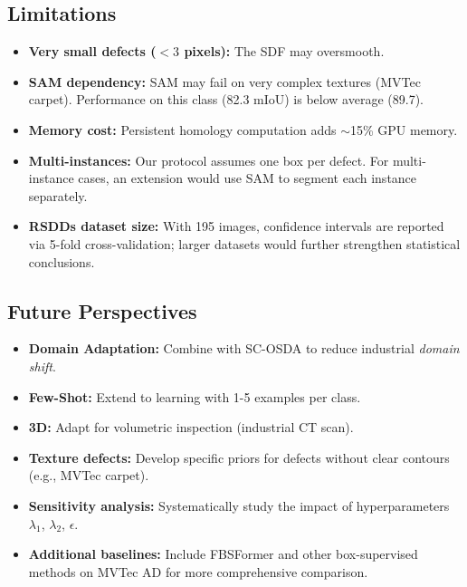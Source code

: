 \documentclass[12pt, a4paper]{article}
\begin{document}
\subsection{Limitations}
\label{subsec:limitations}

\begin{itemize}
    \item \textbf{Very small defects ($< 3$ pixels):} The SDF may oversmooth.
    \item \textbf{SAM dependency:} SAM may fail on very complex textures (MVTec carpet). Performance on this class (82.3 mIoU) is below average (89.7).
    \item \textbf{Memory cost:} Persistent homology computation adds $\sim$15\% GPU memory.
    \item \textbf{Multi-instances:} Our protocol assumes one box per defect. For multi-instance cases, an extension would use SAM to segment each instance separately.
    \item \textbf{RSDDs dataset size:} With 195 images, confidence intervals are reported via 5-fold cross-validation; larger datasets would further strengthen statistical conclusions.
\end{itemize}

\subsection{Future Perspectives}
\label{subsec:future_work}

\begin{itemize}
    \item \textbf{Domain Adaptation:} Combine with SC-OSDA \cite{ma2023scosda} to reduce industrial \textit{domain shift}.
    \item \textbf{Few-Shot:} Extend to learning with 1-5 examples per class.
    \item \textbf{3D:} Adapt for volumetric inspection (industrial CT scan).
    \item \textbf{Texture defects:} Develop specific priors for defects without clear contours (e.g., MVTec carpet).
    \item \textbf{Sensitivity analysis:} Systematically study the impact of hyperparameters $\lambda_1$, $\lambda_2$, $\epsilon$.
    \item \textbf{Additional baselines:} Include FBSFormer and other box-supervised methods on MVTec AD for more comprehensive comparison.
\end{itemize}

\end{document}

